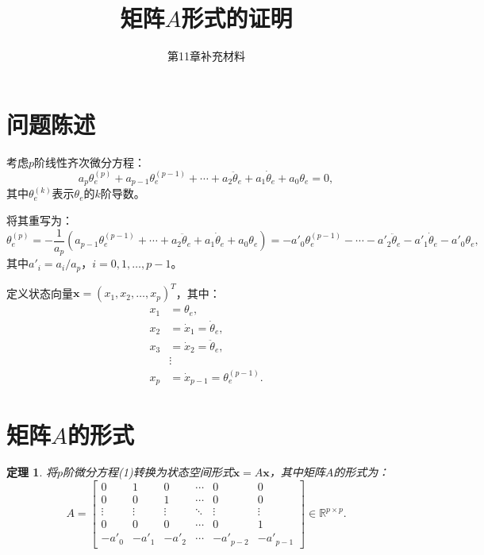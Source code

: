 \documentclass[12pt,a4paper]{article}
\title{矩阵$A$形式的证明}
\author{第11章补充材料}
\date{}
\newtheorem{theorem}{定理}
\begin{document}
\maketitle

\section{问题陈述}

考虑$p$阶线性齐次微分方程：
\begin{equation}
a_p \theta_e^{(p)} + a_{p-1} \theta_e^{(p-1)} + \cdots + a_2 \ddot{\theta}_e + a_1 \dot{\theta}_e + a_0 \theta_e = 0,
\end{equation}
其中$\theta_e^{(k)}$表示$\theta_e$的$k$阶导数。

将其重写为：
\begin{equation}
\theta_e^{(p)} = -\frac{1}{a_p}(a_{p-1} \theta_e^{(p-1)} + \cdots + a_2 \ddot{\theta}_e + a_1 \dot{\theta}_e + a_0 \theta_e) = -a'_0 \theta_e^{(p-1)} - \cdots - a'_2 \ddot{\theta}_e - a'_1 \dot{\theta}_e - a'_0 \theta_e,
\end{equation}
其中$a'_i = a_i/a_p$，$i = 0, 1, \ldots, p-1$。

定义状态向量$\mathbf{x} = (x_1, x_2, \ldots, x_p)^T$，其中：
\begin{align}
x_1 &= \theta_e, \\
x_2 &= \dot{x}_1 = \dot{\theta}_e, \\
x_3 &= \dot{x}_2 = \ddot{\theta}_e, \\
&\vdots \\
x_p &= \dot{x}_{p-1} = \theta_e^{(p-1)}.
\end{align}

\section{矩阵$A$的形式}

\begin{theorem}
将$p$阶微分方程(1)转换为状态空间形式$\dot{\mathbf{x}} = A\mathbf{x}$，其中矩阵$A$的形式为：
\begin{equation}
A = \begin{bmatrix}
0 & 1 & 0 & \cdots & 0 & 0 \\
0 & 0 & 1 & \cdots & 0 & 0 \\
\vdots & \vdots & \vdots & \ddots & \vdots & \vdots \\
0 & 0 & 0 & \cdots & 0 & 1 \\
-a'_0 & -a'_1 & -a'_2 & \cdots & -a'_{p-2} & -a'_{p-1}
\end{bmatrix} \in \mathbb{R}^{p \times p}.
\end{equation}
\end{theorem}
\end{document}
